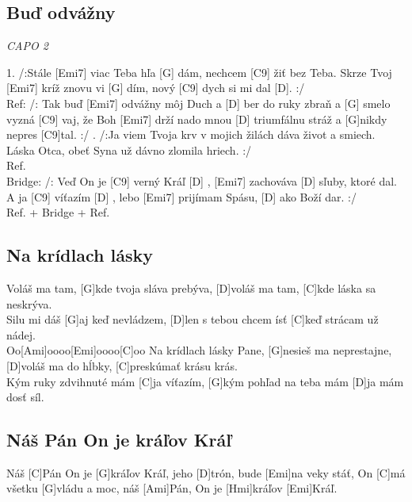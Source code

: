 \documentclass[10pt]{article}
\begin{document}
\begin{Large}
\begin{minipage}{\textwidth}
\subsection{Buď odvážny}
\textit{CAPO 2}
\begin{multicols}{2}
\begin{guitar}
	1. /:Stále [Emi7] viac Teba hľa [G] dám,
	nechcem [C9] žiť bez Teba.
	Skrze Tvoj [Emi7] kríž znovu vi [G] dím,
	nový [C9] dych si mi dal [D]. :/
	\\
	Ref:
	/: Tak buď [Emi7] odvážny môj Duch
	a [D] ber do ruky zbraň
	a [G] smelo vyzná [C9] vaj,
	že Boh [Emi7] drží nado mnou
	[D] triumfálnu stráž
	a [G]nikdy nepres [C9]tal. :/
	. /:Ja viem Tvoja krv
	v mojich žilách dáva život a smiech.
	Láska Otca, obeť Syna 
	už dávno zlomila hriech. :/
	\\
	Ref.
	\\
	Bridge: /: Veď On je [C9] verný Kráľ [D] ,
	[Emi7] zachováva [D] sľuby, ktoré dal.
	A ja [C9] víťazím [D] ,
	lebo [Emi7] prijímam Spásu, [D] ako Boží dar. :/
	\\
	Ref. + Bridge + Ref.
\end{guitar}
\end{multicols}
\end{minipage}

\begin{minipage}{\textwidth}
\subsection{Na krídlach lásky}
\begin{multicols*}{2}
\begin{guitar}
	[Emi]Voláš ma tam,
	[G]kde tvoja sláva prebýva,
	[D]voláš ma tam,
	[C]kde láska sa neskrýva.
	\\
	[Emi]Silu mi dáš
	[G]aj keď nevládzem,
	[D]len s tebou chcem ísť
	[C]keď strácam už nádej.
	\\
	[G]Oo[Ami]oooo[Emi]oooo[C]oo
	\columnbreak
	[Emi]Na krídlach lásky Pane,
	[G]nesieš ma neprestajne,
	[D]voláš ma do hĺbky,
	[C]preskúmať krásu krás.
	\\
	[Emi]Kým ruky zdvihnuté mám
	[C]ja víťazím,
	[G]kým pohľad na teba mám
	[D]ja mám dosť síl.
\end{guitar}
\end{multicols*}
\end{minipage}

\begin{minipage}{\textwidth}
\subsection{Náš Pán On je kráľov Kráľ}
\begin{guitar}
	[Emi]Náš [C]Pán On je [G]kráľov Kráľ, 
	jeho [D]trón, bude [Emi]na veky stáť, 
	On [C]má všetku [G]vládu a moc, 
	náš [Ami]Pán, On je [Hmi]kráľov [Emi]Kráľ.
\end{guitar}
\end{minipage}


\end{Large}
\end{document}
